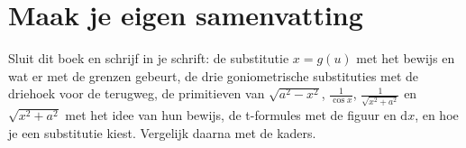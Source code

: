 
\ifzelfstudie
\section*{Maak je eigen samenvatting}
Sluit dit boek en schrijf in je schrift: de substitutie $x = g(u)$ met het bewijs en wat er met de grenzen gebeurt, de drie goniometrische substituties met de driehoek voor de terugweg, de primitieven van $\sqrt{a^2 - x^2}$, $\tfrac{1}{\cos x}$, $\tfrac{1}{\sqrt{x^2 + a^2}}$ en $\sqrt{x^2 + a^2}$ met het idee van hun bewijs, de t-formules met de figuur en $\mathrm{d}x$, en hoe je een substitutie kiest. Vergelijk daarna met de kaders.
\fi
